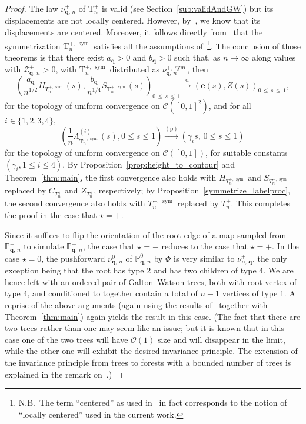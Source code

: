\documentclass[AHL,Unicode,longabstracts,published]{cedram}
\newcommand{\bbP}{\mathbb{P}}
\newcommand{\bfe}{\mathbf{e}}
\newcommand{\bfq}{\mathbf{q}}
\newcommand{\cZ}{\mathcal{Z}}
\newcommand{\cC}{\mathcal{C}}
\newcommand{\cO}{\mathcal{O}}
\newcommand{\rT}{\mathrm{T}}
\DeclareMathOperator{\sym}{sym}
\newcommand{\convdist}{\ensuremath{\stackrel{\mathrm{d}}{\rightarrow}}}
\newcommand{\convpr}{\ensuremath{\stackrel{\mathrm{(p)}}{\longrightarrow}}}
\begin{document}
\begin{proof}
The law $\nu^+_{\bfq,\,n}$ of $\rT_n^+$ is valid (see Section~\ref{sub:validAndGW}) but its displacements are not locally centered. However, by~\cite[Lemma~2]{MiermontInvariance}, we know that its displacements are centered. Moreover, it follows directly from~\cite[Proposition~3]{MiermontInvariance} that the symmetrization $\rT_n^{+,\,\sym}$ satisfies all the assumptions of~\cite[Theorems~2 and~4]{MiermontInvarianceTrees}\footnote{N.B.\ The term ``centered'' as used in~\cite[Theorem~4]{MiermontInvarianceTrees} in fact corresponds to the notion of ``locally centered'' used in the current work.}. The conclusion of those theorems is that there exist $a_{\bfq}>0$ and $b_{\bfq}>0$ such that, as $n \to \infty$ along values with $\cZ_{\bfq,\,n}^+ > 0$, with $\rT_{n}^{+,\,\sym}$ distributed as $\nu^{+,\sym}_{\bfq,\,n}$, then
\[
\left(\frac{a_{\bfq}}{n^{1/2}}H_{T^{+,\,\sym}_n}(s),\frac{b_{\bfq}} {n^{1/4}}S_{\rT^{+,\,\sym}_n}(s)\right)_{0\,\leq\,s\,\leq\,1} \convdist (\bfe (s),Z(s))_{0\,\leq\,s\,\leq\, 1},
\]
for the topology of uniform convergence on $\cC([0,1]^2)$, and for all $i \in \{1,2,3,4\}$,
\[
\left(\frac{1}{n}\Lambda^{(i)}_{\rT^{+,\,\sym}_n}(s),0\leq s\leq 1\right)\convpr \left(\gamma_is,\,0\leq s\leq 1\right)\,
\]
for the topology of uniform convergence on $\cC([0,1])$, for suitable constants $(\gamma_i,1 \le i \le 4)$. By Proposition~\ref{prop:height_to_contour} and Theorem~\ref{thm:main}, the first convergence also holds with $H_{T^{+,\,\sym}_n}$ and $S_{T^{+,\,\sym}_n}$ replaced by $C_{T^{+}_n}$ and $Z_{T^{+}_n}$, respectively; by Proposition~\ref{symmetrize_labelproc}, the second convergence also holds with $T^{+,\,\sym}_n$ replaced by $T^{+}_n$. This completes the proof in the case that $\star=+$.

Since it suffices to flip the orientation of the root edge of a map sampled from $\bbP^+_{\bfq,\,n}$ to simulate $\bbP^-_{\bfq,\,n}$, the case that $\star=-$ reduces to the case that $\star=+$. In the case $\star=0$, the pushforward $\nu^0_{\bfq,\,n}$ of $\bbP^0_{\bfq,\,n}$ by $\Phi$ is very similar to $\nu^+_{\mathbf{n,\,q}}$, the only exception being that the root has type 2 and has two children of type 4. We are hence left with an ordered pair of Galton--Watson trees, both with root vertex of type 4, and conditioned to together contain a total of $n-1$ vertices of type 1. A reprise of the above arguments (again using the results of~\cite{MiermontInvarianceTrees} together with Theorem~\ref{thm:main}) again yields the result in this case. (The fact that there are two trees rather than one may seem like an issue; but it is known that in this case one of the two trees will have $\cO(1)$ size and will disappear in the limit, while the other one will exhibit the desired invariance principle. The extension of the invariance principle from trees to forests with a bounded number of trees is explained in the remark on~\cite[page~1149]{MiermontInvarianceTrees}.)
\end{proof}
\end{document}
